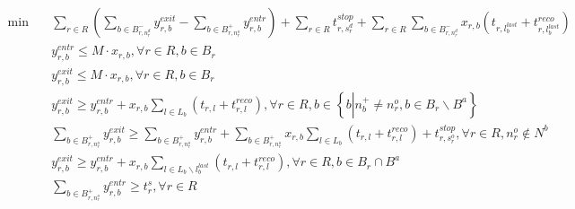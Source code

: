 \begin{align}
  \min\quad & \sum_{r \in R} \left(\underset{b \in B_{r , n_{r}^{d}}^{-}}{\sum} y_{r , b}^{e x i t} - \underset{b \in B_{r , n_{r}^{o}}^{+}}{\sum} y_{r , b}^{e n t r}\right) + \sum_{r \in R} t_{r , s_{r}^{d}}^{s t o p} + \sum_{r \in R} \underset{b \in B_{r , n_{r}^{d}}^{-}}{\sum} x_{r , b} \left(t_{r , l_{b}^{l a s t}} + t_{r , l_{b}^{l a s t}}^{r e c o}\right) \tag{eq\_0001} \\
  & y_{r , b}^{e n t r} \leq M \cdot x_{r , b} , \forall r \in R , b \in B_{r} \tag{eq\_0003} \\
  & y_{r , b}^{e x i t} \leq M \cdot x_{r , b} , \forall r \in R , b \in B_{r} \tag{eq\_0004} \\
  & y_{r , b}^{e x i t} \geq y_{r , b}^{e n t r} + x_{r , b} \sum_{l \in L_{b}} \left(t_{r , l} + t_{r , l}^{r e c o}\right) , \forall r \in R , b \in \left\{\right. b \left|\right. n_{b}^{+} \neq n_{r}^{o} , b \in B_{r} \backslash B^{a} \left.\right\} \tag{eq\_0005} \\
  & \underset{b \in B_{r , n_{r}^{o}}^{+}}{\sum} y_{r , b}^{e x i t} \geq \underset{b \in B_{r , n_{r}^{o}}^{+}}{\sum} y_{r , b}^{e n t r} + \underset{b \in B_{r , n_{r}^{o}}^{+}}{\sum} x_{r , b} \sum_{l \in L_{b}} \left(t_{r , l} + t_{r , l}^{r e c o}\right) + t_{r , s_{r}^{o}}^{s t o p} , \forall r \in R , n_{r}^{o} \notin N^{b} \tag{eq\_0006} \\
  & y_{r , b}^{e x i t} \geq y_{r , b}^{e n t r} + x_{r , b} \sum_{l \in L_{b} \backslash l_{b}^{l a s t}} \left(t_{r , l} + t_{r , l}^{r e c o}\right) , \forall r \in R , b \in B_{r} \cap B^{a} \tag{eq\_0007} \\
  & \underset{b \in B_{r , n_{r}^{o}}^{+}}{\sum} y_{r , b}^{e n t r} \geq t_{r}^{s} , \forall r \in R \tag{eq\_0008} \\

\end{align}
